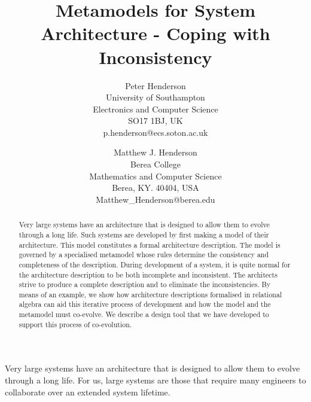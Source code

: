 \documentclass[times, 10pt,twocolumn]{article}
\begin{document}
\title{Metamodels for System Architecture - Coping with Inconsistency}

\author{Peter Henderson\\
University of Southampton\\ Electronics and Computer Science \\ SO17 1BJ, UK\\ p.henderson@ecs.soton.ac.uk\\
\and
Matthew J. Henderson\\
Berea College\\
Mathematics and Computer Science \\ 
Berea, KY. 40404, USA \\ 
Matthew\_Henderson@berea.edu\\
}


\maketitle
\thispagestyle{empty}

\begin{abstract}
Very large systems have an architecture that is designed to allow them to evolve through a long life. Such systems are developed by first making a model of their architecture. This model constitutes a formal architecture description. The model is governed by a specialised metamodel whose rules determine the consistency and completeness of the description. During development of a system, it is quite normal for the architecture description to be both incomplete and inconsistent. The architects strive to produce a complete description and to eliminate the inconsistencies. By means of an example, we show how architecture descriptions formalised in relational algebra can aid this iterative process of development and how the model and the metamodel must co-evolve. We describe a design tool that we have developed to support this process of co-evolution.
\end{abstract}




\noindent Very large systems have an architecture that is designed to allow them to evolve through a long life. For us, large systems are those that require many engineers to collaborate over an extended system lifetime. 
\end{document}
